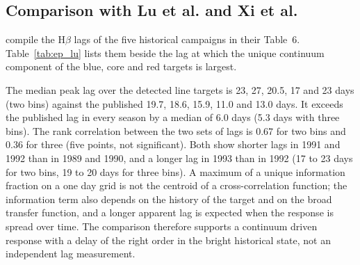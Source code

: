 \subsection{Comparison with Lu et al. and Xi et al.}

\citet{Lu2022} compile the H$\beta$ lags of the five historical campaigns in their
Table~6. Table~\ref{tab:ep_lu} lists them beside the lag at which the unique
continuum component of the blue, core and red targets is largest.

\begin{SURDtable}
\centering
\caption{Published H$\beta$ lag against continuum ($\tau_{\rm H\beta}$, days;
\citealt{Lu2022}, Table~6) and lag in days of the maximum of $U(F)$, with its
normalized value in parentheses, for the blue, core and red targets of the F5100 set
with common lags. A dash means $U(F)<0.05$ at every lag.}
\label{tab:ep_lu}
\footnotesize
\setlength{\tabcolsep}{3pt}

\end{SURDtable}

The median peak lag over the detected line targets is 23, 27, 20.5, 17 and 23 days
(two bins) against the published 19.7, 18.6, 15.9, 11.0 and 13.0 days. It exceeds
the published lag in every season by a median of 6.0 days (5.3 days with three
bins). The rank correlation between the two sets of lags is 0.67 for two bins and
0.36 for three (five points, not significant). Both show shorter lags in 1991 and
1992 than in 1989 and 1990, and a longer lag in 1993 than in 1992 (17 to 23 days for
two bins, 19 to 20 days for three bins). A maximum of a unique information fraction on a one day grid is
not the centroid of a cross-correlation function; the information term also
depends on the history of the target and on the broad transfer function, and a
longer apparent lag is expected when the response is spread over time. The comparison
therefore supports a continuum driven response with a delay of the right order in
the bright historical state, not an independent lag measurement.


